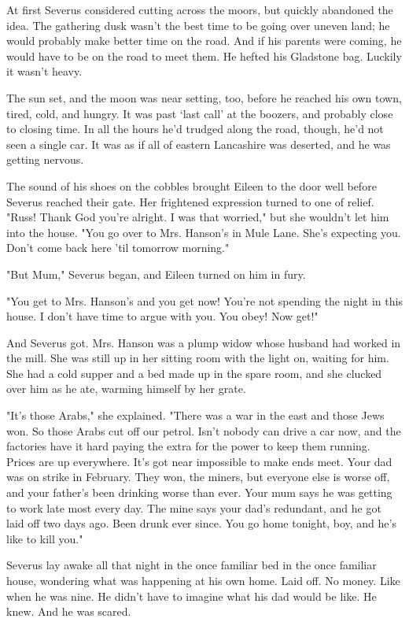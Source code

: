 At first Severus considered cutting across the moors, but quickly abandoned the idea. The gathering dusk wasn't the best time to be going over uneven land; he would probably make better time on the road. And if his parents were coming, he would have to be on the road to meet them. He hefted his Gladstone bag. Luckily it wasn't heavy.

The sun set, and the moon was near setting, too, before he reached his own town, tired, cold, and hungry. It was past `last call' at the boozers, and probably close to closing time. In all the hours he'd trudged along the road, though, he'd not seen a single car. It was as if all of eastern Lancashire was deserted, and he was getting nervous.

The sound of his shoes on the cobbles brought Eileen to the door well before Severus reached their gate. Her frightened expression turned to one of relief. "Russ! Thank God you're alright. I was that worried," but she wouldn't let him into the house. "You go over to Mrs. Hanson's in Mule Lane. She's expecting you. Don't come back here 'til tomorrow morning."

"But Mum," Severus began, and Eileen turned on him in fury.

"You get to Mrs. Hanson's and you get now! You're not spending the night in this house. I don't have time to argue with you. You obey! Now get!"

And Severus got. Mrs. Hanson was a plump widow whose husband had worked in the mill. She was still up in her sitting room with the light on, waiting for him. She had a cold supper and a bed made up in the spare room, and she clucked over him as he ate, warming himself by her grate.

"It's those Arabs," she explained. "There was a war in the east and those Jews won. So those Arabs cut off our petrol. Isn't nobody can drive a car now, and the factories have it hard paying the extra for the power to keep them running. Prices are up everywhere. It's got near impossible to make ends meet. Your dad was on strike in February. They won, the miners, but everyone else is worse off, and your father's been drinking worse than ever. Your mum says he was getting to work late most every day. The mine says your dad's redundant, and he got laid off two days ago. Been drunk ever since. You go home tonight, boy, and he's like to kill you."

Severus lay awake all that night in the once familiar bed in the once familiar house, wondering what was happening at his own home. Laid off. No money. Like when he was nine. He didn't have to imagine what his dad would be like. He knew. And he was scared.

